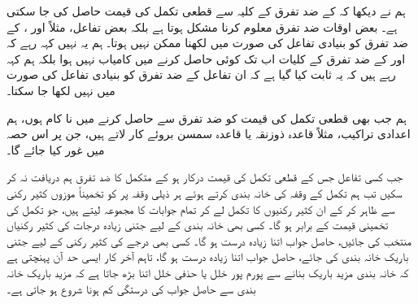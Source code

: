 

ہم نے دیکھا کہ   کے ضد تفرق  کے کلیہ سے قطعی تکمل  کی قیمت   حاصل کی جا سکتی ہے۔ بعض اوقات ضد تفرق معلوم کرنا مشکل ہوتا ہے بلکہ بعض تفاعل، مثلاً  اور ،  کے ضد تفرق کو بنیادی تفاعل کی صورت میں لکھنا ممکن نہیں ہوتا۔ ہم یہ نہیں کہہ رہے   کہ  اور   کے ضد تفرق کے کلیات اب تک کوئی حاصل کرنے میں کامیاب نہیں ہوا بلکہ ہم کہہ رہے ہیں کہ یہ ثابت کیا گیا ہے کہ ان تفاعل کے ضد تفرق کو بنیادی تفاعل کی صورت میں نہیں لکھا جا سکتا۔ 

ہم جب بھی قطعی تکمل کی قیمت کو ضد تفرق سے حاصل کرنے میں نا کام ہوں، ہم اعدادی تراکیب، مثلاً  قاعدہ ذوزنقہ یا قاعدہ سمسن  بروئے کار لاتے ہیں، جن پر اس حصہ میں غور کیا جائے گا۔

جب کسی تفاعل جس کے قطعی تکمل کی قیمت درکار ہو کے متکمل  کا ضد تفرق ہم دریافت نہ کر سکیں تب ہم تکمل کے وقفہ کی خانہ بندی کرتے ہوئے ہر ذیلی وقفہ پر  کو تخمیناً موزوں کثیر رکنی سے ظاہر کر کے ان کثیر رکنیوں کا تکمل لے کر تمام جوابات کا مجموعہ لیتے ہیں، جو تکمل کی تخمینی قیمت کے برابر ہو گا۔ کسی بھی خانہ بندی کے لیے جتنی زیادہ درجات  کی  کثیر رکنیاں منتخب کی جائیں، حاصل جواب اتنا زیادہ درست ہو گا۔ کسی بھی درجے کی کثیر رکنی کے لیے جتنی باریک خانہ بندی کی جائے، حاصل جواب اتنا زیادہ درست ہو گا، تاہم    آخر کار ایسی حد آن پہنچتی ہے کہ خانہ بندی مزید باریک بنانے سے  پورم پور خلل یا حذفی خلل اتنا   بڑھ جاتا ہے کہ مزید باریک خانہ بندی سے حاصل جواب کی درستگی کم ہونا شروع ہو جاتی ہے۔

